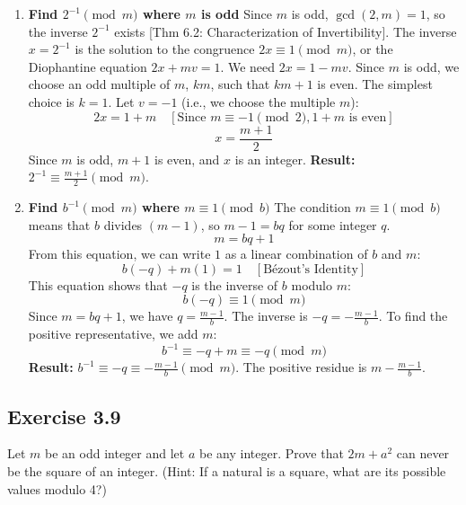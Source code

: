 \begin{solution}
\begin{enumerate}
    \item \textbf{Find $2^{-1} \pmod{m}$ where $m$ is odd}
    Since $m$ is odd, $\gcd(2, m) = 1$, so the inverse $2^{-1}$ exists [Thm 6.2: Characterization of Invertibility].
    The inverse $x = 2^{-1}$ is the solution to the congruence $2x \equiv 1 \pmod{m}$, or the Diophantine equation $2x + mv = 1$.
    We need $2x = 1 - mv$. Since $m$ is odd, we choose an odd multiple of $m$, $k m$, such that $km+1$ is even. The simplest choice is $k=1$.
    Let $v = -1$ (i.e., we choose the multiple $m$):
    $$ 2x = 1 + m \quad [\text{Since } m \equiv -1 \pmod{2}, 1+m \text{ is even}] $$
    $$ x = \frac{m+1}{2} $$
    Since $m$ is odd, $m+1$ is even, and $x$ is an integer.
    \textbf{Result:} $2^{-1} \equiv \frac{m+1}{2} \pmod{m}$.
    
    \item \textbf{Find $b^{-1} \pmod{m}$ where $m \equiv 1 \pmod{b}$}
    The condition $m \equiv 1 \pmod{b}$ means that $b$ divides $(m-1)$, so $m-1 = bq$ for some integer $q$.
    $$ m = bq + 1 $$
    From this equation, we can write $1$ as a linear combination of $b$ and $m$:
    $$ b(-q) + m(1) = 1 \quad [\text{Bézout's Identity}] $$
    This equation shows that $-q$ is the inverse of $b$ modulo $m$:
    $$ b(-q) \equiv 1 \pmod{m} $$
    Since $m = bq + 1$, we have $q = \frac{m-1}{b}$.
    The inverse is $-q = -\frac{m-1}{b}$. To find the positive representative, we add $m$:
    $$ b^{-1} \equiv -q + m \equiv -q \pmod{m} $$
    \textbf{Result:} $b^{-1} \equiv -q \equiv -\frac{m-1}{b} \pmod{m}$. The positive residue is $m - \frac{m-1}{b}$.
\end{enumerate}
\end{solution}

\subsection*{Exercise 3.9}
Let $m$ be an odd integer and let $a$ be any integer. Prove that $2m+a^2$ can never be the square of an integer. (Hint: If a natural is a square, what are its possible values modulo 4?)


